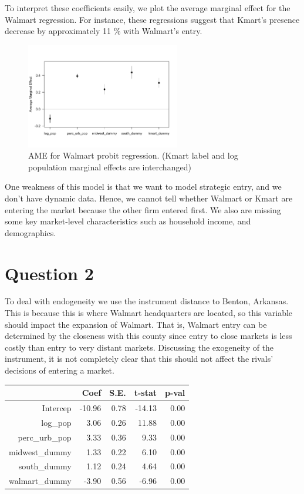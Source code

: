 \documentclass{article}
\theoremstyle{definition}
\begin{document}
To interpret these coefficients easily, we plot the average marginal effect for the Walmart regression. For instance, these regressions suggest that Kmart's presence decrease by approximately 11 \% with Walmart's entry. 




\begin{figure}[h]
\centering
\includegraphics[width=0.6\textwidth]{imgs/ave_1_w.png}
\caption{AME for Walmart probit regression. (Kmart label and log population marginal effects are interchanged)}
\end{figure}

One weakness of this model is that we want to model strategic entry, and we don't have dynamic data. Hence, we cannot tell whether Walmart or Kmart are entering the market because the other firm entered first.  We also are missing some key market-level characteristics such as household income, and demographics. 

\section*{Question 2}

To deal with endogeneity we use the instrument distance to Benton, Arkansas. This is because this is where Walmart headquarters are located, so this variable should impact the expansion of Walmart. That is, Walmart entry can be determined by the closeness with this county since entry to close markets is less costly than entry to very distant markets. Discussing the exogeneity of the instrument, it is not completely clear that this should not affect the rivals' decisions of entering a market. 


\begin{table}[ht]
\centering
\begin{tabular}{rrrrr}
  \hline
 & Coef & S.E. & t-stat & p-val \\ 
  \hline
Intercep & -10.96 & 0.78 & -14.13 & 0.00 \\ 
  log\_pop & 3.06 & 0.26 & 11.88 & 0.00 \\ 
  perc\_urb\_pop & 3.33 & 0.36 & 9.33 & 0.00 \\ 
  midwest\_dummy & 1.33 & 0.22 & 6.10 & 0.00 \\ 
  south\_dummy & 1.12 & 0.24 & 4.64 & 0.00 \\ 
  walmart\_dummy & -3.90 & 0.56 & -6.96 & 0.00 \\ 
   \hline
\end{tabular}
\end{table}
\end{document}
